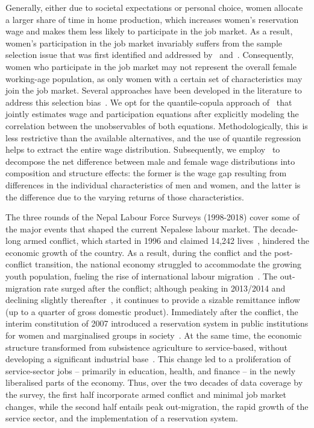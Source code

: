Generally, either due to societal expectations or personal choice, women allocate a larger share of time in home production, which increases women’s reservation wage and makes them less likely to participate in the job market. As a result, women’s participation in the job market invariably suffers from the sample selection issue that was first identified and addressed by~\citet{Heckman1974} and~\citet{Gronau1974}. Consequently, women who participate in the job market may not represent the overall female working-age population, as only women with a certain set of characteristics may join the job market. Several approaches have been developed in the literature to address this selection bias~\citep{Buchinsky1998, Blau2006, Blundell2007, Mulligan2008, Huber2015, Bar2015, Maasoumi2017, Arellano2017}. We opt for the quantile-copula approach of~\citet{Arellano2017} that jointly estimates wage and participation equations after explicitly modeling the correlation between the unobservables of both equations. Methodologically, this is less restrictive than the available alternatives, and the use of quantile regression helps to extract the entire wage distribution. Subsequently, we employ~\citet{Chernozhukov2013} to decompose the net difference between male and female wage distributions into composition and structure effects: the former is the wage gap resulting from differences in the individual characteristics of men and women, and the latter is the difference due to the varying returns of those characteristics.\par

The three rounds of the Nepal Labour Force Surveys (1998-2018) cover some of the major events that shaped the current Nepalese labour market. The decade-long armed conflict, which started in 1996 and claimed 14,242 lives~\citep{Joshi2015}, hindered the economic growth of the country. As a result, during the conflict and the post-conflict transition, the national economy struggled to accommodate the growing youth population, fueling the rise of international labour migration~\citep{libois2016households}. The out-migration rate surged after the conflict; although peaking in 2013/2014 and declining slightly thereafter~\citep{MoLE/GoN2013, MFES/GoN2020}, it continues to provide a sizable remittance inflow (up to a quarter of gross domestic product). Immediately after the conflict, the interim constitution of 2007 introduced a reservation system in public institutions for women and marginalised groups in society~\citep{Subedi2022, Mainali2017}. At the same time, the economic structure transformed from subsistence agriculture to service-based, without developing a significant industrial base~\citep{Sapkota2013}. This change led to a proliferation of service-sector jobs -- primarily in education, health, and finance -- in the newly liberalised parts of the economy. Thus, over the two decades of data coverage by the survey, the first half incorporate armed conflict and minimal job market changes, while the second half entails peak out-migration, the rapid growth of the service sector, and the implementation of a reservation system.\par

